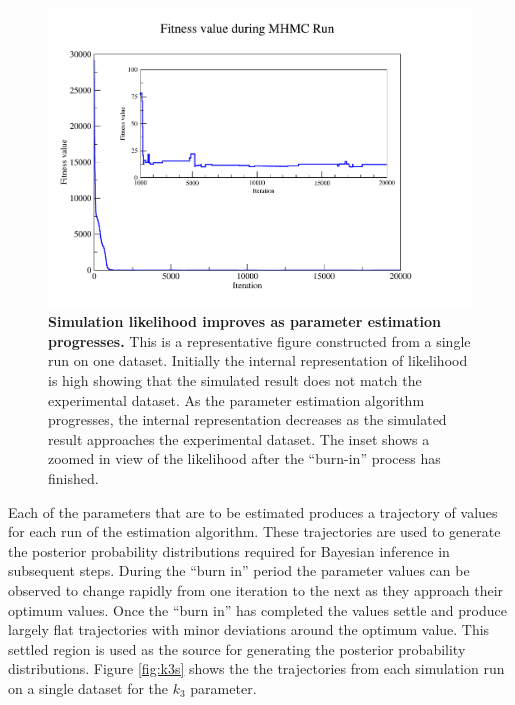 \begin{figure}[tbp]
 \centering
 \includegraphics[width=14cm, trim=75px 50px 125px 25px]{./05-oxygenreduction/data/o2_fitness.pdf}
 \caption[Simulation likelihood improves as parameter estimation progresses]{{\bf Simulation likelihood improves as parameter estimation progresses.} This is a representative figure constructed from a single run on one dataset. Initially the internal representation of likelihood is high showing that the simulated result does not match the experimental dataset. As the parameter estimation algorithm progresses, the internal representation decreases as the simulated result approaches the experimental dataset. The inset shows a zoomed in view of the likelihood after the ``burn-in'' process has finished.
 \label{fig:oxy_fitness}}
\end{figure}

Each of the parameters that are to be estimated produces a trajectory of values for each run of the estimation algorithm. These trajectories are used to generate the posterior probability distributions required for Bayesian inference in subsequent steps. During the ``burn in'' period the parameter values can be observed to change rapidly from one iteration to the next as they approach their optimum values. Once the ``burn in'' has completed the values settle and produce largely flat trajectories with minor deviations around the optimum value. This settled region is used as the source for generating the posterior probability distributions. Figure \ref{fig:k3s} shows the the trajectories from each simulation run on a single dataset for the $k_3$ parameter.

